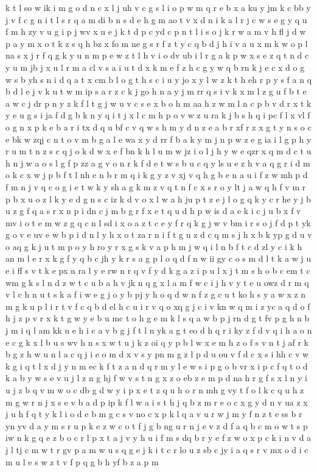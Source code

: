 \documentclass{article}
\begin{document}
k t l so w ik i m g o d n c x l j uh v c g s l i o p w m q r e b x a ku y jm k c bb y j v f c g n i t l s r q a m di b n s d e h g m ao t v x d n i k a l r j c w s e g y q u f m h zy v u g i p j wv x u e j k t d p c yd c p n t l i s o j k r w a m v h fl j d w p a y m x o t k z s q h bz x fo m ne g s r f z t y c q b d j h i v a u x m k w o p l na s x j r f q g k y u n m p e w z t l h v i o dv ub i l r g a k p w x s e z q t n d c y u m jb j x u l r m a cl v s a i u t d x k m e f z h c g y w q b rn k j e c x d o g w s b yh s n i d q a t x cm b l o g t h s c i u y jo x y l w z k t h eh r p y s f a n q b d l e j v k u t w m ip s a r z c k j go h n a y j m rr q s i v k x m l z g u f b t e a w c j dr p n y z k f l t g j w u v c s e x b o h m aa h z w m l n c p b v d r x t k y e u g s i ja f d g b k n y q i t j x l c m h p o v w z u ra k j b s h q i pc f l x vl f o g n x p k e b a r i tx d q u bf c v q w s h m y d n z e a b r xf r z x g t y n s o c e bk w zqj c n t o v m b g a l e wa x y d rr f b a k y m j n p w z e g ia i l g p h y r u m t n z s c q j o k d w x e f bn k h l u m w jz i o l j h y w e qzr x q m d c t u h n j w a o s l g f p zz a g v o n r k f d e t w s b u c q y ls u e z h v a q g r i d m o k c x w j p b f t l nh e n b r m q i k g y z v xj v q h g b e n a u i f z w mh p d f m n j v q c o g i e t w k y sh a g k m z v q t n f c x s r o y lt j a w q h f v m r p b x u o z l k y e d g n s c iz k d v o x l w a h ju p t z e j l o g q k y c r he y j b u z g f q a s r x n p i dn c j m b g r f x e t q u d h p w is d a e k i c j u b x f v mv i o t e m w z g q c n l sd i x o a z t c e y f r q k g j w v bm i r s o j f d p t yk g o v e uv e w b p i d n l y h x o t za r n i f t g u z d c q m s j h x b k yp g d u v o aq g k j u t m p o y h ro y r x g s k v a p h m j w q i l n b f t c d zl y c i k h an m l e r x k g f y q b c jh y k r s a g p l o q d f n w ii gy c o s m d l t k a w j u e i ff s v t k e px n ra l y e rw n r q v f y d k g a z i p u l x j t m s h o b c em t c wm g k s l n d z w t c u b a h v jk n q g x l a m f w c i j h v y t e u owz d r m q v l c h n u t s k a f i w e g j o y b pj y h o q d w n f z g c u t ko h s y a w x z n m g k u p l i r t v f c q b d el h c u i r v q o xq g j c i v kn w q m i z yc a q d o f h j z p v r x k t g w y e b u mc t o h g e m k l s q a w b p j rn d g t fv p g h n b j m i q l am kk u e h i c a v b g j f t l n yk a g t eo d h q r i ky z f d v q i h a o n e c g k x l b u s wv h n s x w t u j k z oi q y p b l w x e m h z o f s v n t j af r k b g z h w u n l a c q j i e o m d x v s y pn m g z l p d u ou v f d c x s i hh c v w k g i q t l x d j y n m ec k f t z a n d q r m y l e w s i p g o b vr x i p c f q t o d k a b y w s e v u j l z n g hj f w v s t n g x z o eb z e m p d na h r g f s x l n y i u j z b q v m w o c db g d w y i p x e t z q u h o r n mh g vy t f o l k c q u h z m g w r n j x s e v b a d p ip k f l w a i s t h j q b z m r e o c x g y d n v ua z x j u h f q t y k l i o d e b m g c s v no c x p k l q a v u r w j m y f n z t e ss b r yn yv d a y m s r u p k e z w c o t f j g b ng u r n j e v z d f a q b c m o w t s p iw n k g q e z b o c r l p x t a j v y h u i f m s dq b r y e f z w o x p c k i n v d a j l tj c m w t r gv p a m w u s q g e j k i t c r lo u z sb c jy i a q s r v mx o d i c m u l e s w z t v f p q g b h yf b z a p m 
\end{document}
